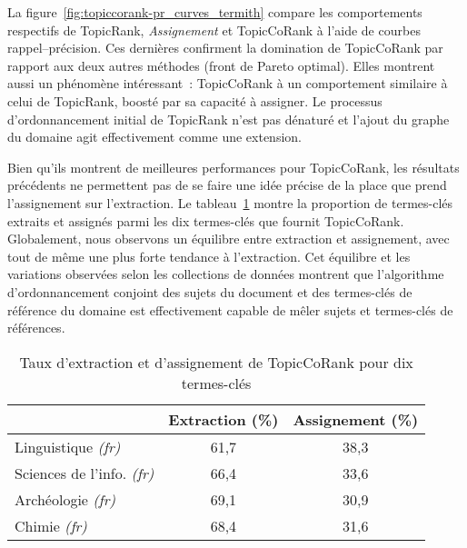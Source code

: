         La figure~\ref{fig:topiccorank-pr_curves_termith} compare les
        comportements respectifs de TopicRank, \textit{Assignement} et
        TopicCoRank à l'aide de courbes rappel--précision. Ces dernières
        confirment la domination de TopicCoRank par rapport aux deux autres
        méthodes (front de Pareto optimal). Elles montrent aussi un phénomène
        intéressant~: TopicCoRank à un comportement similaire à celui de
        TopicRank, boosté par sa capacité à assigner. Le processus
        d'ordonnancement initial de TopicRank n'est pas dénaturé et l'ajout du
        graphe du domaine agit effectivement comme une extension.
        

        Bien qu'ils montrent de meilleures performances pour TopicCoRank, les
        résultats précédents ne permettent pas de se faire une idée précise de
        la place que prend l'assignement sur l'extraction. Le
        tableau~\ref{tab:assignment_ratio} montre la proportion de termes-clés
        extraits et assignés parmi les dix termes-clés que fournit TopicCoRank.
        Globalement, nous observons un équilibre entre extraction et
        assignement, avec tout de même une plus forte tendance à l'extraction.
        Cet équilibre et les variations observées selon les collections de
        données montrent que l'algorithme d'ordonnancement conjoint des sujets
        du document et des termes-clés de référence du domaine est effectivement
        capable de mêler sujets et termes-clés de références.
        \begin{table}[!h]
          \centering
          \begin{tabular}{l|c|c}
              \toprule
              & Extraction (\%) & Assignement (\%)\\
              \hline
              Linguistique \textit{(fr)} & 61,7 & 38,3\\
              Sciences de l'info. \textit{(fr)} & 66,4 & 33,6\\
              Archéologie \textit{(fr)} & 69,1 & 30,9\\
              Chimie \textit{(fr)} & 68,4 & 31,6\\
              \bottomrule
          \end{tabular}
          \caption{Taux d'extraction et d'assignement de TopicCoRank pour dix
                   termes-clés
                   \label{tab:assignment_ratio}}
        \end{table}

